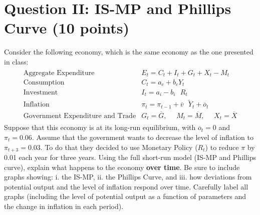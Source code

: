 \documentclass[letterpaper,12pt]{article}
\theoremstyle{dotlessS}
\begin{document}
\section*{Question II: IS-MP and Phillips Curve (10 points)}
Consider the following economy, which is the same economy as the one presented in class:
\begin{eqnarray*}
\begin{array}{ll}
\text{Aggregate Expenditure} &E_t=C_t+I_t+G_t+X_t-M_t \\[1.4ex]
\text{Consumption} &C_t=a_c+b_c Y_t \\[1.4ex]
\text{Investment} & I_t=a_i-b_i \: \: \: R_t \\[1.4ex]
\text{Inflation} &\pi_t=\pi_{t-1}+\overline{v} \: \: \: \widetilde{Y}_t+\overline{o}_t  \\[1.4ex]
\text{Government Expenditure and Trade} & G_t=\overline{G}, \: \: \: \: \: \: M_t=\overline{M}, \: \: \: \: \: \: X_t=\overline{X}
\end{array}
\end{eqnarray*}
Suppose that this economy is at its long-run equilibrium, with $\overline{o}_t=0 $ and $\pi_t=0.06$. Assume that the government wants to decrease the level of inflation to $\pi_{t+3}=0.03$. To do that they decided to use Monetary Policy ($R_t$) to reduce $\pi$ by 0.01 each year for three years. Using the full short-run model (IS-MP and Phillips curve), explain what happens to the economy \textbf{over time}. Be sure to include graphs showing: i. the IS-MP, ii. the Phillips Curve, and iii. how deviations from potential output and the level of inflation respond over time. Carefully label all graphs (including the level of potential output as a  function of parameters and the change in inflation in each period). 
\end{document}
